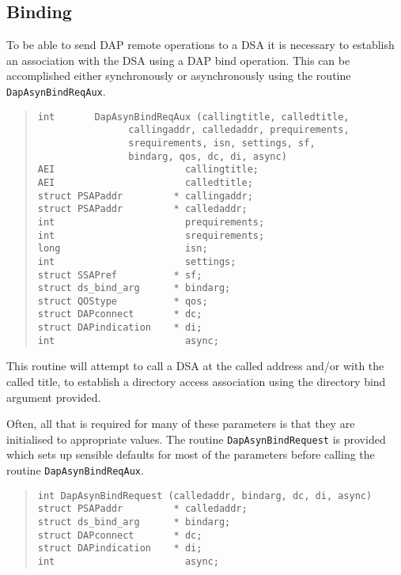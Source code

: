 \subsection {Binding}

To be able to send DAP remote operations to a DSA it is necessary
to establish an association with the DSA using a DAP bind operation.
This can be accomplished either synchronously or asynchronously
using the routine \verb"DapAsynBindReqAux".

\begin{quote}\small\begin{verbatim}
int       DapAsynBindReqAux (callingtitle, calledtitle,
                callingaddr, calledaddr, prequirements,
                srequirements, isn, settings, sf,
                bindarg, qos, dc, di, async)
AEI                       callingtitle;
AEI                       calledtitle;
struct PSAPaddr         * callingaddr;
struct PSAPaddr         * calledaddr;
int                       prequirements;
int                       srequirements;
long                      isn;
int                       settings;
struct SSAPref          * sf;
struct ds_bind_arg      * bindarg;
struct QOStype          * qos;
struct DAPconnect       * dc;
struct DAPindication    * di;
int                       async;
\end{verbatim}\end{quote}

This routine will attempt to call a DSA at the called address and/or
with the called title, to establish a directory access association
using the directory bind argument provided.

Often, all that is required for many of these parameters is that they
are initialised to appropriate values.
The routine \verb"DapAsynBindRequest" is provided which sets up
sensible defaults for most of the parameters before calling
the routine \verb"DapAsynBindReqAux".

\begin{quote}\small\begin{verbatim}
int DapAsynBindRequest (calledaddr, bindarg, dc, di, async)
struct PSAPaddr         * calledaddr;
struct ds_bind_arg      * bindarg;
struct DAPconnect       * dc;
struct DAPindication    * di;
int                       async;
\end{verbatim}\end{quote}

